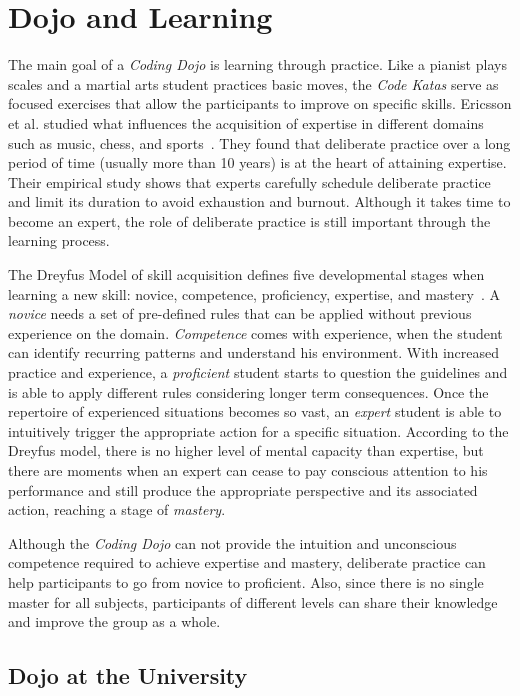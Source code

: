 \section{Dojo and Learning}\label{sec:learning}

The main goal of a \emph{Coding Dojo} is learning through practice. Like a pianist
plays scales and a martial arts student practices basic moves, the \emph{Code Katas}
serve as focused exercises that allow the participants to improve on specific skills.
Ericsson et al. studied what influences the acquisition of expertise in
different domains such as music, chess, and sports~\cite{DeliberatePractice}. They found
that deliberate practice over a long period of time (usually more than 10 years) is at the
heart of attaining expertise. Their empirical study shows that experts carefully schedule
deliberate practice and limit its duration to avoid exhaustion and burnout. Although it
takes time to become an expert, the role of deliberate practice is still important through
the learning process.

The Dreyfus Model of skill acquisition defines five developmental stages when learning
a new skill: novice, competence, proficiency, expertise, and mastery~\cite{Dreyfus}. A
\emph{novice} needs a set of pre-defined rules that can be applied without
previous experience on the domain. \emph{Competence} comes with experience, when the student
can identify recurring patterns and understand his environment. With increased practice and
experience, a \emph{proficient} student starts to question the guidelines and is able to
apply different rules considering longer term consequences. Once the repertoire of
experienced situations becomes so vast, an \emph{expert} student is able to intuitively
trigger the appropriate action for a specific situation. According to the Dreyfus model,
there is no higher level of mental capacity than expertise, but there are moments when an
expert can cease to pay conscious attention to his performance and still produce the
appropriate perspective and its associated action, reaching a stage of \emph{mastery}.

Although the \emph{Coding Dojo} can not provide the intuition and unconscious competence
required to achieve expertise and mastery, deliberate practice
can help participants to go from novice to proficient. Also, since
there is no single master for all subjects, participants of different levels can
share their knowledge and improve the group as a whole.

\subsection{Dojo at the University}

